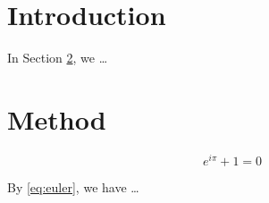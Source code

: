 \documentclass{article}
\begin{document}
\section{Introduction}
\label{sec:intro}

In Section \ref{sec:method}, we \ldots

\section{Method}
\label{sec:method}

\begin{equation}
\label{eq:euler}
e^{i\pi} + 1 = 0
\end{equation}

By \eqref{eq:euler}, we have \ldots
\end{document}
